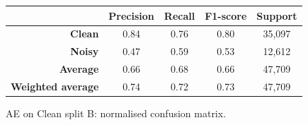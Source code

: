 \documentclass[a4paper,10pt]{article}
\begin{document}
\begin{figure}[p]
{\begin{minipage}{0.6\textwidth}
			\caption{AE on Clean split B: normalised confusion matrix.}%
			\label{fig:ae_clean_b_cm}
		\end{minipage}
	}
	\baselineskip
	\begin{tabular}{r|c|c|c|c}
		                          & \textbf{Precision} & \textbf{Recall} & \textbf{F1-score} & \textbf{Support} \\ \midrule
		\textbf{Clean}            & 0.84               & 0.76            & 0.80              & 35,097           \\
		\textbf{Noisy}            & 0.47               & 0.59            & 0.53              & 12,612           \\ \midrule
		\textbf{Average}          & 0.66               & 0.68            & 0.66              & 47,709           \\
		\textbf{Weighted average} & 0.74               & 0.72            & 0.73              & 47,709
	\end{tabular}
	\label{tab:ae_clean_b_cr}
\end{figure}
\end{document}
